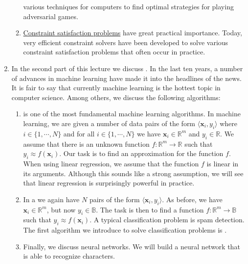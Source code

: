 \begin{enumerate}
\begin{enumerate}
            various techniques for computers to find optimal strategies for playing adversarial games.
      \item \href{https://en.wikipedia.org/wiki/Constraint_satisfaction_problem}{Constraint satisfaction problems} 
            have great practical importance.  Today, very efficient constraint solvers have been developed to
            solve various constraint satisfaction problems that often occur in practice.
      \end{enumerate}
\item In the second part of this lecture we discuss .  In the last ten years, a number of
      advances in machine learning have made it into the headlines of the news.  It is fair to say that
      currently machine learning is the hottest topic in computer science.  Among others, we discuss the following
      algorithms:
      \begin{enumerate}
      \item {} is one of the most fundamental machine learning algorithms.
            In machine learning, we are given a number of data pairs of the form  $\langle \mathbf{x}_i, y_i \rangle$ 
            where $i \in \{1,\cdots,N\}$ and for all $i \in \{1,\cdots,N\}$ we have $\mathbf{x}_i \in \mathbb{R}^m$
            and $y_i \in \mathbb{R}$.  We assume that there is an unknown function $f:\mathbb{R}^m \rightarrow \mathbb{R}$
            such that $y_i \approx f(\mathbf{x}_i)$.  Our task is to find an approximation for the function
            $f$.  When using linear regression, we assume that the function $f$ is linear in its arguments.
            Although this sounds like a strong assumption, we will see that linear regression is surprisingly
            powerful in practice.
      \item In a  we again have $N$ pairs of the form $\langle \mathbf{x}_i, y_i
        \rangle$.
            As before,  we have $\mathbf{x}_i \in \mathbb{R}^m$, but now $y_i \in \mathbb{B}$.
            The task is then to find a function $f:\mathbb{R}^m \rightarrow \mathbb{B}$     
            such that $y_i \approx f(\mathbf{x}_i)$.  A typical classification problem is spam detection.  The first algorithm we introduce to
            solve classification problems is .
      \item Finally, we discuss neural networks.  We will build a neural network that is able to recognize characters.
      \end{enumerate}
\end{enumerate}
\pagebreak


